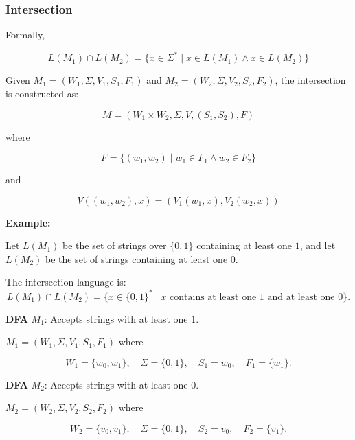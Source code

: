 \documentclass[12pt,a4paper,openany]{article}
\begin{document}
\subsubsection{Intersection}

Formally,

\[L(M_1) \cap L(M_2) = \{x \in \Sigma^* \mid x \in L(M_1) \land x \in L(M_2)\}\]

Given $M_1 = (W_1, \Sigma, V_1, S_1, F_1)$ and $M_2 = (W_2, \Sigma, V_2, S_2, F_2)$, the intersection is constructed as:

\[M = (W_1 \times W_2, \Sigma, V, (S_1, S_2), F)\]

where

\[F = \{(w_1, w_2) \mid w_1 \in F_1 \land w_2 \in F_2\}\]

and

\[V((w_1, w_2), x) = (V_1(w_1, x), V_2(w_2, x))\]

\textbf{Example:}

Let $L(M_1)$ be the set of strings over $\{0,1\}$ containing at least one $1$,  
and let $L(M_2)$ be the set of strings containing at least one $0$.

The intersection language is:
\[
L(M_1) \cap L(M_2) = \{ x \in \{0,1\}^* \mid x \text{ contains at least one } 1 \text{ and at least one } 0 \}.
\]

\textbf{DFA} $M_1$: Accepts strings with at least one $1$.

$M_1 = (W_1,\Sigma,V_1,S_1,F_1)$ where

\[
W_1 = \{w_0,w_1\}, \quad
\Sigma = \{0,1\}, \quad
S_1 = w_0, \quad
F_1 = \{w_1\}.
\]

\begin{center}
\end{center}

\textbf{DFA} $M_2$: Accepts strings with at least one $0$.

$M_2 = (W_2,\Sigma,V_2,S_2,F_2)$ where

\[
W_2 = \{v_0,v_1\}, \quad
\Sigma = \{0,1\}, \quad
S_2 = v_0, \quad
F_2 = \{v_1\}.
\]
\end{document}
